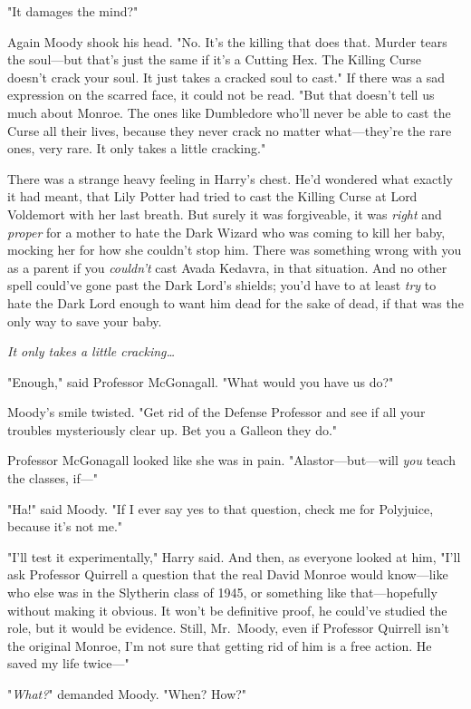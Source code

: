 "It damages the mind?"

Again Moody shook his head. "No. It's the killing that does that. Murder tears the soul---but that's just the same if it's a Cutting Hex. The Killing Curse doesn't crack your soul. It just takes a cracked soul to cast." If there was a sad expression on the scarred face, it could not be read. "But that doesn't tell us much about Monroe. The ones like Dumbledore who'll never be able to cast the Curse all their lives, because they never crack no matter what---they're the rare ones, very rare. It only takes a little cracking."

There was a strange heavy feeling in Harry's chest. He'd wondered what exactly it had meant, that Lily Potter had tried to cast the Killing Curse at Lord Voldemort with her last breath. But surely it was forgiveable, it was \emph{right} and\emph{ proper} for a mother to hate the Dark Wizard who was coming to kill her baby, mocking her for how she couldn't stop him. There was something wrong with you as a parent if you \emph{couldn't} cast Avada Kedavra, in that situation. And no other spell could've gone past the Dark Lord's shields; you'd have to at least \emph{try} to hate the Dark Lord enough to want him dead for the sake of dead, if that was the only way to save your baby.

\emph{It only takes a little cracking{\ldots}}

"Enough," said Professor McGonagall. "What would you have us do?"

Moody's smile twisted. "Get rid of the Defense Professor and see if all your troubles mysteriously clear up. Bet you a Galleon they do."

Professor McGonagall looked like she was in pain. "Alastor---but---will \emph{you} teach the classes, if---"

"Ha!" said Moody. "If I ever say yes to that question, check me for Polyjuice, because it's not me."

"I'll test it experimentally," Harry said. And then, as everyone looked at him, "I'll ask Professor Quirrell a question that the real David Monroe would know---like who else was in the Slytherin class of 1945, or something like that---hopefully without making it obvious. It won't be definitive proof, he could've studied the role, but it would be evidence. Still, Mr.~Moody, even if Professor Quirrell isn't the original Monroe, I'm not sure that getting rid of him is a free action. He saved my life twice---"

"\emph{What?}" demanded Moody. "When? How?"


